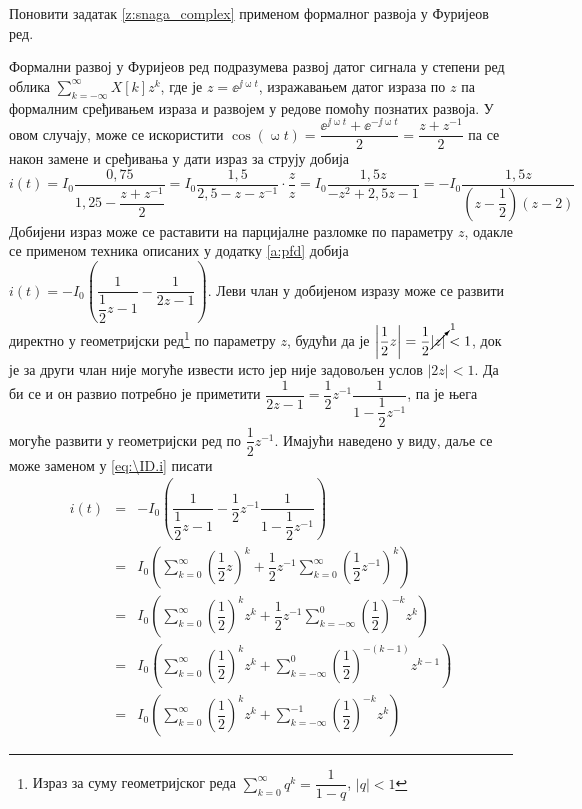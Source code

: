 \PID Поновити задатак \ref{z:snaga_complex} применом формалног развоја у Фуријеов ред. 

\RESENJE

Формални развој у Фуријеов ред подразумева развој датог сигнала у степени ред облика 
$\sum_{k = -\infty}^{\infty} X[k] z^{k}$, где је $z = \ee^{\jj\upomega t}$, изражавањем датог израза по 
$z$ па формалним сређивањем израза и развојем у редове помоћу познатих развоја. У овом случају, може се искористити $\cos(\upomega t) = \dfrac{\ee^{\jj\upomega t} + \ee^{-\jj\upomega t}}{2} 
= \dfrac{z + z^{-1}}{2}$ па се након замене и сређивања у дати израз за струју добија 
\begin{equation}
    i(t) = I_0 \dfrac{0,75}{1,25 - \dfrac{z + z^{-1}}{2} } 
         = I_0 \dfrac{1,5}{2,5 - z - z^{-1}}  
         \cdot 
         \dfrac{z}{z}
         = I_0 \dfrac{1,5 z}{ -z^2 + 2,5 z - 1 } 
         =  -I_0 \dfrac{1,5 z}{ \left( z - \dfrac{1}{2} \right) (z - 2) } \label{eq:\ID.i}
\end{equation}
Добијени израз може се раставити на парцијалне разломке по параметру $z$, одакле се применом техника описаних 
у додатку \ref{a:pfd} добија 
$
    i(t) = -I_0 \left( \dfrac{1}{\dfrac{1}{2}z - 1} - \dfrac{1}{2z - 1} \right). 
$ Леви члан у добијеном изразу може се развити директно у геометријски ред\footnote{Израз за суму геометријског реда 
$\sum_{k = 0}^{\infty} q^k = \dfrac{1}{1 - q}$, $|q| < 1$ } по параметру $z$, будући да је 
$\left\lvert\dfrac{1}{2} z\right\rvert = \dfrac{1}{2} \cancelto{1}{|z|}  < 1$, док је 
за други члан није могуће извести исто јер није задовољен услов $|2z| < 1$. Да би се и он развио потребно је приметити
$
\dfrac{1}{2z - 1} = \dfrac{1}{2}z^{-1} \dfrac{1}{1 - \dfrac{1}{2}z^{-1} }
$, па је њега могуће развити у геометријски ред по $\dfrac{1}{2}z^{-1}$. Имајући наведено у виду, даље се може 
заменом у \eqref{eq:\ID.i} писати
\begin{eqnarray}
    i(t) &=& -I_0 \left(
        \dfrac{1}{\dfrac{1}{2}z - 1} - \dfrac{1}{2}z^{-1} \dfrac{1}{1 - \dfrac{1}{2}z^{-1} }    
    \right) \\[2mm]
    &=& I_0 \left(
      \sum_{k = 0}^{\infty} \left(\dfrac{1}{2}z \right)^k + \dfrac{1}{2} z^{-1} \sum_{k = 0}^{\infty} \left(\dfrac{1}{2} z^{-1} \right)^k     
    \right) \\[2mm]
    &=&
    I_0 \left(
        \sum_{k = 0}^{\infty} \left(\dfrac{1}{2} \right)^k z^k + \dfrac{1}{2} z^{-1} \sum_{k = -\infty}^{0} \left(\dfrac{1}{2}\right)^{-k} z^{k}     
    \right)
    \\[2mm] &=&
    I_0 \left(
        \sum_{k = 0}^{\infty} \left(\dfrac{1}{2} \right)^k z^k + \sum_{k = -\infty}^{0} \left(\dfrac{1}{2}\right)^{-(k-1)} z^{k-1}     
    \right) \\[2mm]
        &=&
    I_0 \left(
        \sum_{k = 0}^{\infty} \left(\dfrac{1}{2} \right)^k z^k + \sum_{k = -\infty}^{-1} \left(\dfrac{1}{2}\right)^{-k} z^k     
    \right)
\end{eqnarray}

